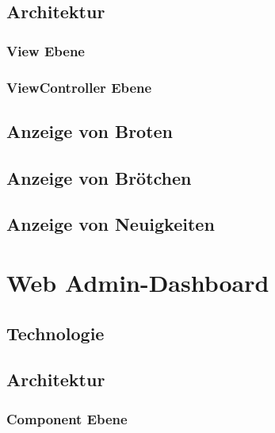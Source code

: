 \subsection{Architektur}

\subsubsection{View Ebene}

\clearpage

\subsubsection{ViewController Ebene}

\clearpage

\subsection{Anzeige von Broten}

\clearpage

\subsection{Anzeige von Brötchen}

\clearpage

\subsection{Anzeige von Neuigkeiten}

\clearpage

\section{Web Admin-Dashboard}

\subsection{Technologie}

\clearpage

\subsection{Architektur}

\subsubsection{Component Ebene}

